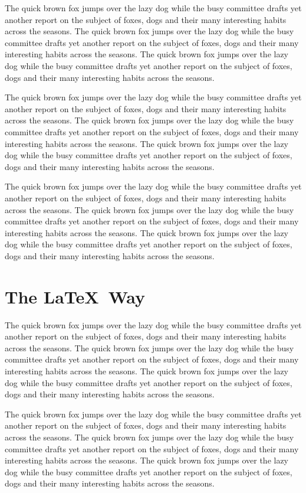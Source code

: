 \documentclass{article}
\begin{document}
The quick brown fox jumps over the lazy dog while the busy committee drafts yet another report on the subject of foxes, dogs and their many interesting habits across the seasons. The quick brown fox jumps over the lazy dog while the busy committee drafts yet another report on the subject of foxes, dogs and their many interesting habits across the seasons. The quick brown fox jumps over the lazy dog while the busy committee drafts yet another report on the subject of foxes, dogs and their many interesting habits across the seasons. 

The quick brown fox jumps over the lazy dog while the busy committee drafts yet another report on the subject of foxes, dogs and their many interesting habits across the seasons. The quick brown fox jumps over the lazy dog while the busy committee drafts yet another report on the subject of foxes, dogs and their many interesting habits across the seasons. The quick brown fox jumps over the lazy dog while the busy committee drafts yet another report on the subject of foxes, dogs and their many interesting habits across the seasons. 

The quick brown fox jumps over the lazy dog while the busy committee drafts yet another report on the subject of foxes, dogs and their many interesting habits across the seasons. The quick brown fox jumps over the lazy dog while the busy committee drafts yet another report on the subject of foxes, dogs and their many interesting habits across the seasons. The quick brown fox jumps over the lazy dog while the busy committee drafts yet another report on the subject of foxes, dogs and their many interesting habits across the seasons. 

\section{The \LaTeX\ Way}\label{sec2}
The quick brown fox jumps over the lazy dog while the busy committee drafts yet another report on the subject of foxes, dogs and their many interesting habits across the seasons. The quick brown fox jumps over the lazy dog while the busy committee drafts yet another report on the subject of foxes, dogs and their many interesting habits across the seasons. The quick brown fox jumps over the lazy dog while the busy committee drafts yet another report on the subject of foxes, dogs and their many interesting habits across the seasons. 

The quick brown fox jumps over the lazy dog while the busy committee drafts yet another report on the subject of foxes, dogs and their many interesting habits across the seasons. The quick brown fox jumps over the lazy dog while the busy committee drafts yet another report on the subject of foxes, dogs and their many interesting habits across the seasons. The quick brown fox jumps over the lazy dog while the busy committee drafts yet another report on the subject of foxes, dogs and their many interesting habits across the seasons. 
\end{document}
